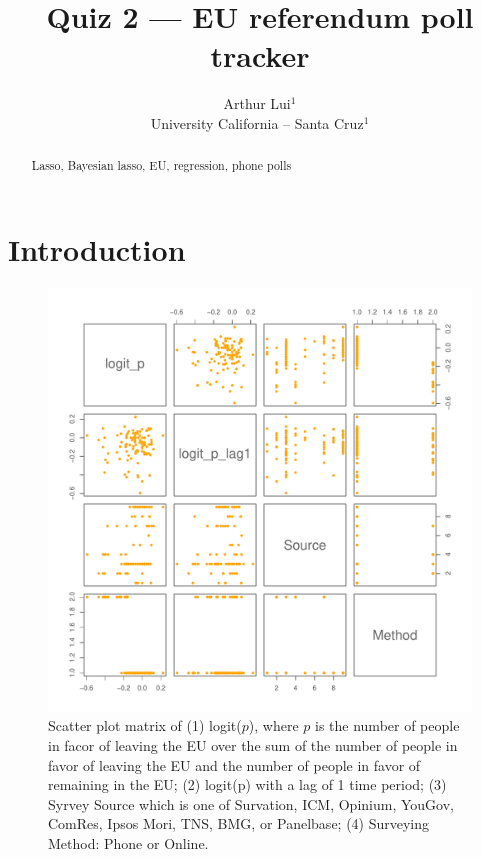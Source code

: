 \documentclass{../../tex_template/asaproc}
\title{Quiz 2 --- EU referendum poll tracker}
\author{
  Arthur Lui$^1$\\
  University California -- Santa Cruz$^1$\\
}
\begin{document}
\maketitle
\begin{abstract}

\begin{keywords}
Lasso, Bayesian lasso, EU, regression, phone polls
\end{keywords}
\end{abstract}

\section{Introduction}

\begin{figure}[H]
  \includegraphics[scale=.5]{figs/pairs.pdf}
  \caption{\small Scatter plot matrix of (1) logit($p$), where $p$ is the
    number of people in facor of leaving the EU over the sum of the number of
    people in favor of leaving the EU and the number of people in favor of
    remaining in the EU; (2) logit(p) with a lag of 1 time period; (3) Syrvey
    Source which is one of Survation, ICM, Opinium, YouGov, ComRes, Ipsos Mori,
    TNS, BMG, or Panelbase; (4) Surveying Method: Phone or Online.}
  \label{fig:pairs}
\end{figure}
\end{document}
